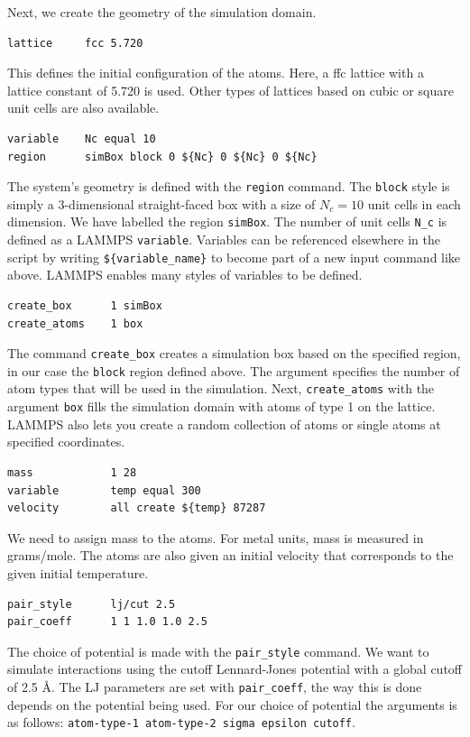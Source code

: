 \documentclass[twoside,english]{uiofysmaster}
\begin{document}
\noindent Next, we create the geometry of the simulation domain.
\begin{lstlisting}
lattice 	fcc 5.720
\end{lstlisting}
This defines the initial configuration of the atoms. 
Here, a ffc lattice with a lattice constant of
5.720 is used. Other types of lattices based on
cubic or square unit cells are also available. 
\begin{lstlisting}
variable	Nc equal 10
region 		simBox block 0 ${Nc} 0 ${Nc} 0 ${Nc}
\end{lstlisting}
The system's geometry is defined with the \texttt{region}
command. The \texttt{block} style is simply a 3-dimensional
straight-faced box with a size of $N_c = 10$ unit
cells in each dimension. We have labelled the 
region \texttt{simBox}. 
The number of unit cells
\texttt{N\_c} is defined as a LAMMPS \texttt{variable}. Variables
can be referenced elsewhere in the script by
writing \texttt{\$\{variable\_name\}} to become part of a new input
command like above. LAMMPS enables many styles
of variables to be defined. 
\begin{lstlisting}
create_box		1 simBox
create_atoms	1 box
\end{lstlisting}
The command \texttt{create\_box} creates a simulation box 
based on the specified region, in our case the 
\texttt{block} region defined above. The argument specifies
the number of atom types that will be used in the
simulation. Next, \texttt{create\_atoms} with the argument
\texttt{box} fills the simulation
domain with atoms of type 1 on the lattice. 
LAMMPS also lets you create a random collection
of atoms or single atoms at specified coordinates.
\begin{lstlisting}
mass			1 28
variable		temp equal 300
velocity		all create ${temp} 87287 
\end{lstlisting}
We need to assign mass to the atoms. For metal units, 
mass is measured in grams/mole. The atoms are also
given an initial velocity that corresponds to 
the given initial temperature. 
\begin{lstlisting}
pair_style		lj/cut 2.5
pair_coeff		1 1 1.0 1.0 2.5
\end{lstlisting}
The choice of potential is made with the 
\texttt{pair\_style} command. We want to simulate
interactions using the cutoff Lennard-Jones potential
with a global cutoff of 2.5 Å. The LJ parameters
are set with \texttt{pair\_coeff}, the way this is done
depends on the potential being used. For our
choice of potential the arguments is as follows:
\texttt{atom-type-1 atom-type-2 sigma epsilon cutoff}. 
\end{document}
